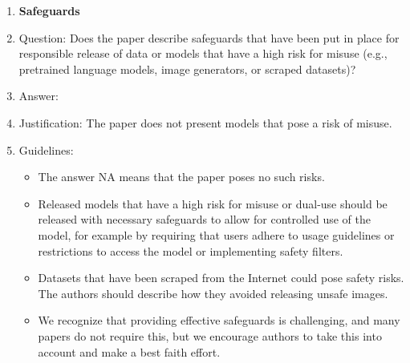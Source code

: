 \documentclass{article}
\theoremstyle{definition} \newtheorem{definition}{Definition}  \newtheorem{example}{Example}
\theoremstyle{remark} \newtheorem{remark}{Remark}
\newcounter{ct}
\begin{document}
\begin{enumerate}
\item {\bf Safeguards}
    \item[] Question: Does the paper describe safeguards that have been put in place for responsible release of data or models that have a high risk for misuse (e.g., pretrained language models, image generators, or scraped datasets)?
    \item[] Answer: \answerNA{} %
    \item[] Justification: The paper does not present models that pose a risk of misuse.
    \item[] Guidelines:
    \begin{itemize}
        \item The answer NA means that the paper poses no such risks.
        \item Released models that have a high risk for misuse or dual-use should be released with necessary safeguards to allow for controlled use of the model, for example by requiring that users adhere to usage guidelines or restrictions to access the model or implementing safety filters. 
        \item Datasets that have been scraped from the Internet could pose safety risks. The authors should describe how they avoided releasing unsafe images.
        \item We recognize that providing effective safeguards is challenging, and many papers do not require this, but we encourage authors to take this into account and make a best faith effort.
    \end{itemize}


\end{enumerate}
\end{document}
